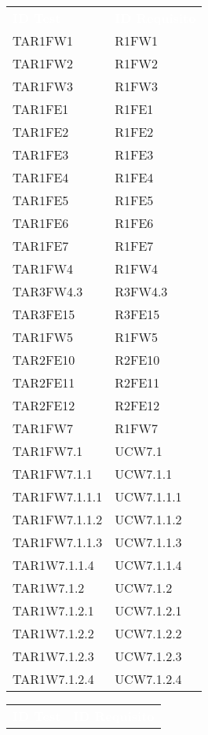 \begin{table}[H]
\renewcommand{\arraystretch}{1.5}
\begin{tabular}[t]{ m{}<{\centering}  m{}<{\centering} }
	\rowcolor{darkblue}
	\textcolor{white}{\textbf{ID Test}} &\textcolor{white}{\textbf{ID Requisito}}\\ 
	 
	TAR1FW1 & R1FW1 \\
	TAR1FW2 &  R1FW2 \\
	TAR1FW3 & R1FW3 \\
	TAR1FE1 & R1FE1 \\
	TAR1FE2 & R1FE2 \\
	TAR1FE3 & R1FE3 \\
	TAR1FE4 & R1FE4 \\
	TAR1FE5 & R1FE5 \\
	TAR1FE6 & R1FE6 \\
	TAR1FE7 & R1FE7 \\
	TAR1FW4 & R1FW4 \\
	TAR3FW4.3 & R3FW4.3\\
	TAR3FE15 & R3FE15 \\
	TAR1FW5 & R1FW5 \\
	TAR2FE10 & R2FE10 \\	 
	TAR2FE11 & R2FE11 \\
	TAR2FE12 & R2FE12 \\
	TAR1FW7 & R1FW7 \\
	TAR1FW7.1 & UCW7.1 \\
	TAR1FW7.1.1 & UCW7.1.1 \\
	TAR1FW7.1.1.1 & UCW7.1.1.1 \\
	TAR1FW7.1.1.2 & UCW7.1.1.2 \\
	TAR1FW7.1.1.3 & UCW7.1.1.3 \\
	TAR1W7.1.1.4 & UCW7.1.1.4 \\
	TAR1W7.1.2 & UCW7.1.2 \\
	TAR1W7.1.2.1 & UCW7.1.2.1 \\
	TAR1W7.1.2.2 & UCW7.1.2.2 \\
	TAR1W7.1.2.3 & UCW7.1.2.3 \\
	TAR1W7.1.2.4 & UCW7.1.2.4 \\
\end{tabular}
\begin{tabular}[t]{ m{}<{\centering}  m{}<{\centering} }
	\rowcolor{darkblue}
	\textcolor{white}{\textbf{ID Test}} &\textcolor{white}{\textbf{ID Requisito}}\\
	

\end{tabular}
\end{table}
